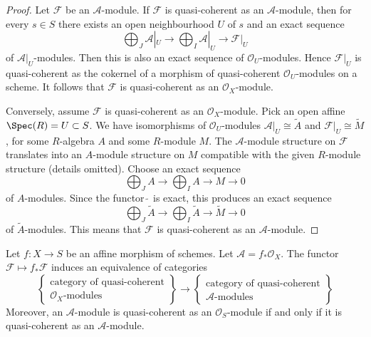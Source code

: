 \begin{proof}
Let $\mathcal{F}$ be an $\mathcal{A}$-module.
If $\mathcal{F}$ is quasi-coherent as an $\mathcal{A}$-module, then
for every $s \in S$ there exists an open neighbourhood $U$ of $s$
and an exact sequence
$$
\bigoplus\nolimits_J\mathcal{A}|_U\to
\bigoplus\nolimits_I\mathcal{A}|_U\to
\mathcal{F}|_U
$$
of $\mathcal{A}|_U$-modules.
Then this is also an exact sequence of $\mathcal{O}_U$-modules.
Hence $\mathcal{F}|_U$ is quasi-coherent as the cokernel of a morphism
of quasi-coherent $\mathcal{O}_U$-modules on a scheme. It follows
that $\mathcal{F}$ is quasi-coherent as an $\mathcal{O}_X$-module.

\medskip\noindent
Conversely, assume $\mathcal{F}$ is quasi-coherent as an $\mathcal{O}_X$-module.
Pick an open affine $\Spec(R) = U \subset S$. We have isomorphisms of
$\mathcal{O}_U$-modules $\mathcal{A}|_U \cong \widetilde{A}$ and
$\mathcal{F}|_U \cong \widetilde{M}$, for some $R$-algebra $A$
and some $R$-module $M$. The $\mathcal{A}$-module structure on $\mathcal{F}$
translates into an $A$-module structure on $M$ compatible with the
given $R$-module structure (details omitted). Choose an exact sequence
$$
\bigoplus\nolimits_J A \to
\bigoplus\nolimits_I A \to
M \to 0
$$
of $A$-modules. Since the functor $\widetilde{\ }$ is exact, this
produces an exact sequence
$$
\bigoplus\nolimits_J \widetilde{A}\to
\bigoplus\nolimits_I \widetilde{A}\to
\widetilde{M} \to 0
$$
of $\widetilde{A}$-modules. This means that
$\mathcal{F}$ is quasi-coherent as an $\mathcal{A}$-module.
\end{proof}

\begin{lemma}
\label{lemma-affine-equivalence-modules}
Let $f : X \to S$ be an affine morphism of schemes.
Let $\mathcal{A} = f_*\mathcal{O}_X$.
The functor $\mathcal{F} \mapsto f_*\mathcal{F}$ induces
an equivalence of categories
$$
\left\{
\begin{matrix}
\text{category of quasi-coherent}\\
\mathcal{O}_X\text{-modules}
\end{matrix}
\right\}
\longrightarrow
\left\{
\begin{matrix}
\text{category of quasi-coherent}\\
\mathcal{A}\text{-modules}
\end{matrix}
\right\}
$$
Moreover, an $\mathcal{A}$-module is
quasi-coherent as an $\mathcal{O}_S$-module if and only if
it is quasi-coherent as an $\mathcal{A}$-module.
\end{lemma}


